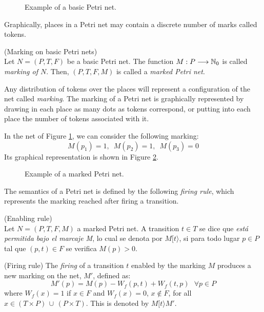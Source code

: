\begin{figure}

\caption{\label{fig201} Example of a basic Petri net.}
\end{figure}

Graphically, places in a Petri net may contain a discrete number of marks called tokens. 

\begin{definition} (Marking on basic Petri nets)\\
Let $N=(P,T,F)$ be a basic Petri net.
The function $M: P \longrightarrow
\mathbb{N}_{0}$ is called {\it marking of $N$}. Then,
$(P,T,F,M)$ is called a {\it marked Petri net}.
\end{definition}

Any distribution of tokens over the places will represent a configuration of the net called \emph{marking}.
The marking of a Petri net is graphically represented by drawing
in each place as many dots as tokens correspond,
or putting into each place the number of tokens associated with it. 


\begin{example} In the net of Figure \ref{fig201}, we can consider the following marking:
\[ M(p_1) = 1,\,\,\,M(p_2)=1,\,\,\,M(p_3)=0 \]
Its graphical representation is shown in Figure \ref{fig202}.
\end{example}

\begin{figure}

\caption{\label{fig202} Example of a marked Petri net.}
\end{figure}

The semantics of a Petri net is defined by the following \emph{firing rule}, which
represents the marking reached after firing a transition.

\begin{definition} (Enabling rule)\\
Let $N=(P,T,F,M)$ a marked Petri net. A transition $t \in T$
se dice que {\it est\'{a} permitida bajo el marcaje M},
lo cual se denota por $M[t\rangle$, si para todo
lugar $p \in P$ tal que $(p,t) \in F$ se verifica $M(p) > 0$.
\end{definition}

\begin{definition}(Firing rule)
The \emph{firing} of a transition $t$ enabled by the marking $M$
produces a new marking on the net, $M'$, defined as:
\[M'(p) = M(p) - W_f(p,t) + W_f(t,p)~~~\forall p \in P\]
where $W_f(x) = 1$ if $x \in F$ and $W_f(x) = 0$, $x \not\in F$,
for all $x \in (T \times P) \, \cup \, (P \times T)$.
This is denoted by $M[t\rangle M'$.
\end{definition}

